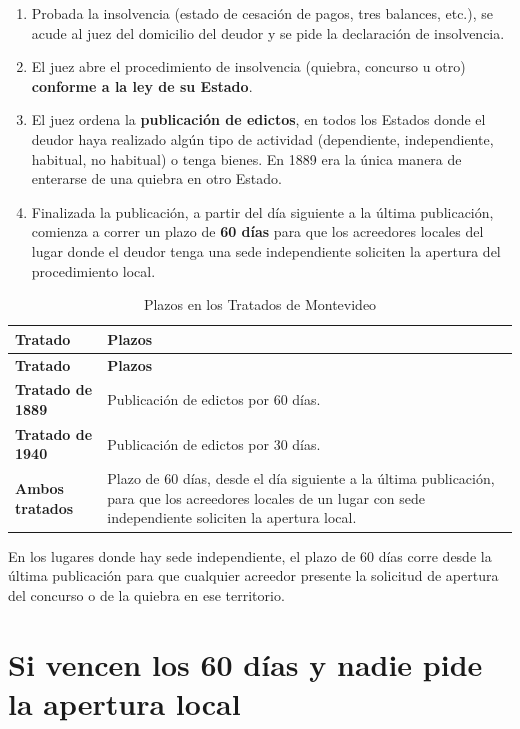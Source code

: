 \documentclass[12pt,oneside]{book}
\begin{document}
\begin{enumerate}
    \item Probada la insolvencia (estado de cesación de pagos, tres balances, etc.), se acude al juez del domicilio del deudor y se pide la declaración de insolvencia.
    \item El juez abre el procedimiento de insolvencia (quiebra, concurso u otro) \textbf{conforme a la ley de su Estado}.
    \item El juez ordena la \textbf{publicación de edictos}, en todos los Estados donde el deudor haya realizado algún tipo de actividad (dependiente, independiente, habitual, no habitual) o tenga bienes. En 1889 era la única manera de enterarse de una quiebra en otro Estado.
    \item Finalizada la publicación, a partir del día siguiente a la última publicación, comienza a correr un plazo de \textbf{60 días} para que los acreedores locales del lugar donde el deudor tenga una sede independiente soliciten la apertura del procedimiento local.
\end{enumerate}

\begin{longtable}{>{\raggedright\arraybackslash}p{} >{\raggedright\arraybackslash}p{}}
\caption{Plazos en los Tratados de Montevideo}\\
\toprule
\textbf{Tratado} & \textbf{Plazos} \\
\midrule
\endfirsthead
\toprule
\textbf{Tratado} & \textbf{Plazos} \\
\midrule
\endhead
\bottomrule
\endlastfoot
\textbf{Tratado de 1889} & Publicación de edictos por 60 días. \\
\textbf{Tratado de 1940} & Publicación de edictos por 30 días. \\
\textbf{Ambos tratados} & Plazo de 60 días, desde el día siguiente a la última publicación, para que los acreedores locales de un lugar con sede independiente soliciten la apertura local. \\
\end{longtable}

En los lugares donde hay sede independiente, el plazo de 60 días corre desde la última publicación para que cualquier acreedor presente la solicitud de apertura del concurso o de la quiebra en ese territorio.

\section{Si vencen los 60 días y nadie pide la apertura local}
\end{document}
